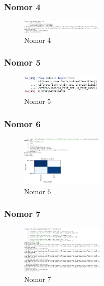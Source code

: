 \subsubsection{Nomor 4}
\hfill\break

\begin{figure}[H]
\centering
\includegraphics[width=4cm]{figures/1174074/4/no4.jpg}
\caption{Nomor 4}
\end{figure}

\subsubsection{Nomor 5}
\hfill\break

\begin{figure}[H]
\centering
\includegraphics[width=4cm]{figures/1174074/4/no5.jpg}
\caption{Nomor 5}
\end{figure}

\subsubsection{Nomor 6}
\hfill\break

\begin{figure}[H]
\centering
\includegraphics[width=4cm]{figures/1174074/4/no6.jpg}
\caption{Nomor 6}
\end{figure}

\subsubsection{Nomor 7}
\hfill\break

\begin{figure}[H]
\centering
\includegraphics[width=4cm]{figures/1174074/4/no7.jpg}
\caption{Nomor 7}
\end{figure}

